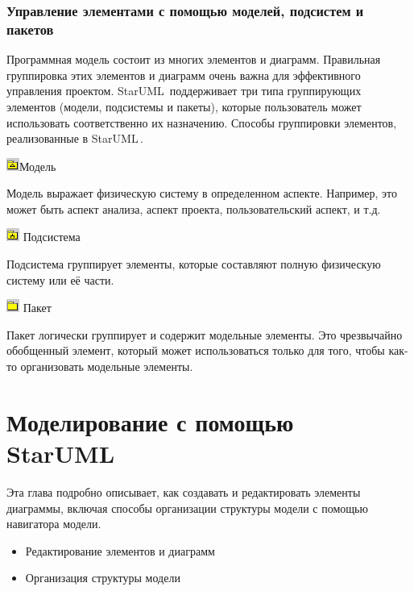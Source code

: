\documentclass[a4paper,12pt]{extreport}
\newcommand{\staruml}{StarUML\,\tm}
\begin{document}
\subsection*{Управление элементами с помощью моделей, подсистем и пакетов}
Программная модель состоит из многих элементов и диаграмм. Правильная группировка этих
элементов и диаграмм очень важна для эффективного управления проектом. \staruml
поддерживает три типа группирующих элементов (модели, подсистемы и пакеты), которые
пользователь может использовать соответственно их назначению.
Способы группировки элементов, реализованные в \staruml.


\includegraphics[width=3ex]{images/folder}Модель

Модель выражает физическую систему в определенном аспекте. Например, это может быть аспект
анализа, аспект проекта, пользовательский аспект, и т.д.

\includegraphics[width=3ex]{images/subsistem}
Подсистема

Подсистема группирует элементы, которые составляют полную физическую систему или её части.

\includegraphics[width=3ex]{images/package}
Пакет

Пакет логически группирует и содержит модельные элементы. Это чрезвычайно обобщенный
элемент, который может использоваться только для того, чтобы как-то организовать модельные
элементы.

\chapter{Моделирование с помощью \staruml}
Эта глава подробно описывает, как создавать и редактировать элементы диаграммы, включая
способы организации структуры модели с помощью навигатора модели.
\begin{itemize}
	\item Редактирование элементов и диаграмм
	\item Организация структуры модели
\end{itemize}
\end{document}
